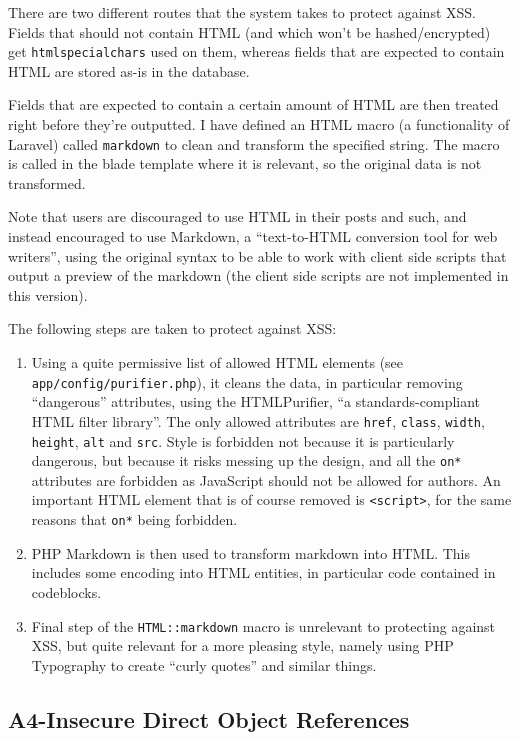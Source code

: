 There are two different routes that the system takes to protect against XSS. Fields that should not contain HTML (and which won't be hashed/encrypted) get \texttt{htmlspecialchars} used on them, whereas fields that are expected to contain HTML are stored as-is in the database.

Fields that are expected to contain a certain amount of HTML are then treated right before they're outputted. I have defined an HTML macro (a functionality of Laravel) called \texttt{markdown} to clean and transform the specified string. The macro is called in the blade
template where it is relevant, so the original data is not transformed.

Note that users are discouraged to use HTML in their posts and such, and instead encouraged to use Markdown, a ``text-to-HTML conversion tool for web writers''\citep{Markdown2013}, using the original syntax to be able to work with client side scripts that output a preview of the markdown (the client side scripts are not implemented in this version).

The following steps are taken to protect against XSS:

\begin{enumerate}[1.]
\item
  Using a quite permissive list of allowed HTML elements (see \texttt{app/config/purifier.php}), it cleans the data, in particular removing ``dangerous'' attributes, using the HTMLPurifier, ``a standards-compliant HTML filter library''\citep{Purifier2013}. The only allowed attributes are \texttt{href}, \texttt{class}, \texttt{width}, \texttt{height}, \texttt{alt} and \texttt{src}. Style is forbidden not
  because it is particularly dangerous, but because it risks messing up the design, and all the \texttt{on*} attributes are forbidden as JavaScript should not be allowed for authors. An important HTML element that is of course removed is \texttt{\textless{}script\textgreater{}}, for the same reasons that \texttt{on*} being forbidden.
\item
  PHP Markdown is then used to transform markdown into HTML. This includes some encoding into HTML entities, in particular code contained in codeblocks.
\item
  Final step of the \texttt{HTML::markdown} macro is unrelevant to protecting against XSS, but quite relevant for a more pleasing style, namely using PHP Typography to create ``curly quotes'' and similar things.
\end{enumerate}

\subsection{A4-Insecure Direct Object References}

